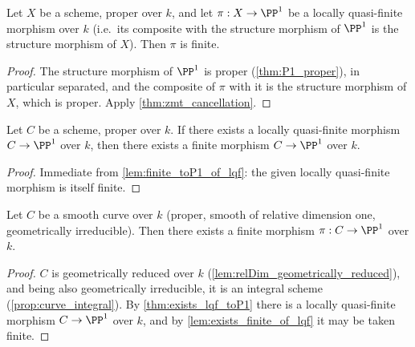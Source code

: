 \begin{lemma}
  \label{lem:finite_toP1_of_lqf}
  \leanok
  Let \(X\) be a scheme, proper over \(k\), and let \(\pi : X \to \PP^1\) be a locally
  quasi-finite morphism over \(k\) (i.e.\ its composite with the structure morphism of
  \(\PP^1\) is the structure morphism of \(X\)). Then \(\pi\) is finite.
\end{lemma}
\begin{proof}
  \leanok
  The structure morphism of \(\PP^1\) is proper (\ref{thm:P1_proper}), in particular
  separated, and the composite of \(\pi\) with it is the structure morphism of \(X\), which
  is proper. Apply \ref{thm:zmt_cancellation}.
\end{proof}

\begin{lemma}
  \label{lem:exists_finite_of_lqf}
  \leanok
  Let \(C\) be a scheme, proper over \(k\). If there exists a locally quasi-finite morphism
  \(C \to \PP^1\) over \(k\), then there exists a finite morphism \(C \to \PP^1\) over \(k\).
\end{lemma}
\begin{proof}
  \leanok
  Immediate from \ref{lem:finite_toP1_of_lqf}: the given locally quasi-finite morphism is
  itself finite.
\end{proof}

\begin{theorem}
  \label{thm:exists_finite_toP1}
  \leanok
  Let \(C\) be a smooth curve over \(k\) (proper, smooth of relative dimension one,
  geometrically irreducible). Then there exists a finite morphism \(\pi : C \to \PP^1\) over
  \(k\).
\end{theorem}
\begin{proof}
  \leanok
  \(C\) is geometrically reduced over \(k\) (\ref{lem:relDim_geometrically_reduced}), and
  being also geometrically irreducible, it is an integral scheme
  (\ref{prop:curve_integral}). By \ref{thm:exists_lqf_toP1} there is a locally quasi-finite
  morphism \(C \to \PP^1\) over \(k\), and by \ref{lem:exists_finite_of_lqf} it may be
  taken finite.
\end{proof}


